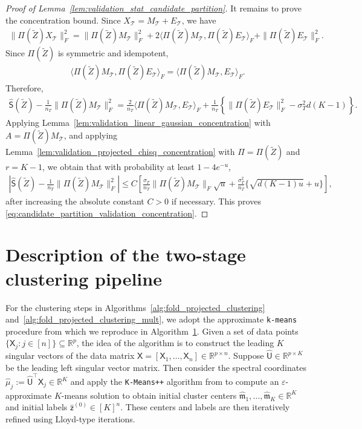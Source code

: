 \documentclass[10pt]{article}
\newcommand{\R}{\mathbb R}
\newcommand{\wh}{\widehat}
\newcommand{\wt}{\widetilde}
\newcommand{\calT}{\mathcal T}
\newcommand{\trg}{T}
\newcommand{\nT}{n_{\trg}}
\newcommand{\sigmaT}{\sigma_{\trg}}
\begin{document}
\begin{proof}[Proof of Lemma~\ref{lem:validation_stat_candidate_partition}]
It remains to prove the concentration bound. Since $X_\calT=M_\calT+E_\calT$,
we have
\begin{align}
    \|\Pi(\wt Z)X_\calT\|_F^2
    =
    \|\Pi(\wt Z)M_\calT\|_F^2
    +2\langle \Pi(\wt Z)M_\calT,\Pi(\wt Z)E_\calT\rangle_F
    +\|\Pi(\wt Z)E_\calT\|_F^2.
\end{align}
Since $\Pi(\wt Z)$ is symmetric and idempotent,
\begin{align}
    \langle \Pi(\wt Z)M_\calT,\Pi(\wt Z)E_\calT\rangle_F
    =
    \langle \Pi(\wt Z)M_\calT,E_\calT\rangle_F.
\end{align}
Therefore,
\begin{align}
\label{eq:candidate_partition_validation_decomp}
    \wh{\mathsf S}(\wt Z)-\frac{1}{\nT}\|\Pi(\wt Z)M_\calT\|_F^2
    =
    \frac{2}{\nT}\langle \Pi(\wt Z)M_\calT,E_\calT\rangle_F
    +\frac{1}{\nT}\left\{\|\Pi(\wt Z)E_\calT\|_F^2-\sigmaT^2d(K-1)\right\}.
\end{align}
Applying Lemma~\ref{lem:validation_linear_gaussian_concentration} with
$A=\Pi(\wt Z)M_\calT$, and applying
Lemma~\ref{lem:validation_projected_chisq_concentration} with
$\Pi=\Pi(\wt Z)$ and $r=K-1$, we obtain that with probability at least
$1-4e^{-u}$,
\begin{align}
    \left|\wh{\mathsf S}(\wt Z)-\frac{1}{\nT}\|\Pi(\wt Z)M_\calT\|_F^2\right|
    \le
    C\left[
    \frac{\sigmaT}{\nT}\|\Pi(\wt Z)M_\calT\|_F\sqrt{u}
    +\frac{\sigmaT^2}{\nT}\{\sqrt{d(K-1)u}+u\}
    \right],
\end{align}
after increasing the absolute constant $C>0$ if necessary. This proves
\eqref{eq:candidate_partition_validation_concentration}.

\end{proof}


\iffalse

\section{Description of the two-stage clustering pipeline}
\label{sec:two_stage}
For the clustering steps in Algorithms~\ref{alg:fold_projected_clustering} and~\ref{alg:fold_projected_clustering_mult}, we adopt the approximate \texttt{k-means} procedure from \citet{gao2022iterative} which we reproduce in Algorithm~\ref{sec:two_stage}. Given a set of data points $\{\mathsf{X}_j:j \in [n]\}\subseteq \R^p$, the idea of the algorithm is to construct the leading $K$ singular vectors of the data matrix $\mathsf{X}=[\mathsf{X}_1,\ldots,\mathsf{X}_n] \in \R^{p \times n}$. Suppose $\wh{\mathsf{U}} \in \R^{p \times K}$ be the leading left singular vector matrix. Then consider the spectral coordinates $\wh \mu_j:=\wh{\mathsf{U}}^\top \mathsf{X}_j \in \R^K$ and apply the \texttt{K-Means++} algorithm from \citet{arthur2007k} to compute an $\varepsilon$-approximate $K$-means solution to obtain initial cluster centers \(\widehat{\mathfrak m}_1,\ldots,\widehat{\mathfrak m}_K\in\R^K\)
and initial labels \(\widehat{\mathsf z}^{(0)}\in[K]^n\). These centers and labels are then iteratively refined using Lloyd-type iterations.
\end{document}
